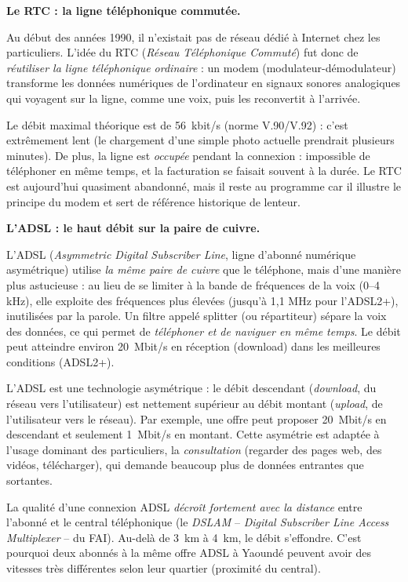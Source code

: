 \documentclass[11pt]{article}
\newcommand{\cle}[1]{{\popxbold\color{popdark}#1}}
\begin{document}
\textbf{Le RTC : la ligne téléphonique commutée.}\par
Au début des années 1990, il n'existait pas de réseau dédié à Internet chez les particuliers. L'idée du \cle{RTC} (\emph{Réseau Téléphonique Commuté}) fut donc de \emph{réutiliser la ligne téléphonique ordinaire} : un \cle{modem} (modulateur-démodulateur) transforme les données numériques de l'ordinateur en signaux sonores analogiques qui voyagent sur la ligne, comme une voix, puis les reconvertit à l'arrivée.

Le débit maximal théorique est de \SI{56}{kbit/s} (norme V.90/V.92) : c'est extrêmement lent (le chargement d'une simple photo actuelle prendrait plusieurs minutes). De plus, la ligne est \emph{occupée} pendant la connexion : impossible de téléphoner en même temps, et la facturation se faisait souvent à la durée. Le RTC est aujourd'hui quasiment abandonné, mais il reste au programme car il illustre le principe du modem et sert de référence historique de lenteur.

\textbf{L'ADSL : le haut débit sur la paire de cuivre.}\par
L'\cle{ADSL} (\emph{Asymmetric Digital Subscriber Line}, ligne d'abonné numérique asymétrique) utilise \emph{la même paire de cuivre} que le téléphone, mais d'une manière plus astucieuse : au lieu de se limiter à la bande de fréquences de la voix (0--4 kHz), elle exploite des fréquences plus élevées (jusqu'à 1,1 MHz pour l'ADSL2+), inutilisées par la parole. Un filtre appelé \cle{splitter} (ou répartiteur) sépare la voix des données, ce qui permet de \emph{téléphoner et de naviguer en même temps}. Le débit peut atteindre environ \SI{20}{Mbit/s} en réception (download) dans les meilleures conditions (ADSL2+).

\begin{propriete}
L'ADSL est une technologie \cle{asymétrique} : le \cle{débit descendant} (\emph{download}, du réseau vers l'utilisateur) est nettement supérieur au \cle{débit montant} (\emph{upload}, de l'utilisateur vers le réseau). Par exemple, une offre peut proposer \SI{20}{Mbit/s} en descendant et seulement \SI{1}{Mbit/s} en montant. Cette asymétrie est adaptée à l'usage dominant des particuliers, la \emph{consultation} (regarder des pages web, des vidéos, télécharger), qui demande beaucoup plus de données entrantes que sortantes.
\end{propriete}

\begin{attention}
La qualité d'une connexion ADSL \emph{décroît fortement avec la distance} entre l'abonné et le central téléphonique (le \emph{DSLAM} -- \emph{Digital Subscriber Line Access Multiplexer} -- du FAI). Au-delà de \SI{3}{km} à \SI{4}{km}, le débit s'effondre. C'est pourquoi deux abonnés à la même offre ADSL à Yaoundé peuvent avoir des vitesses très différentes selon leur quartier (proximité du central).
\end{attention}
\end{document}
